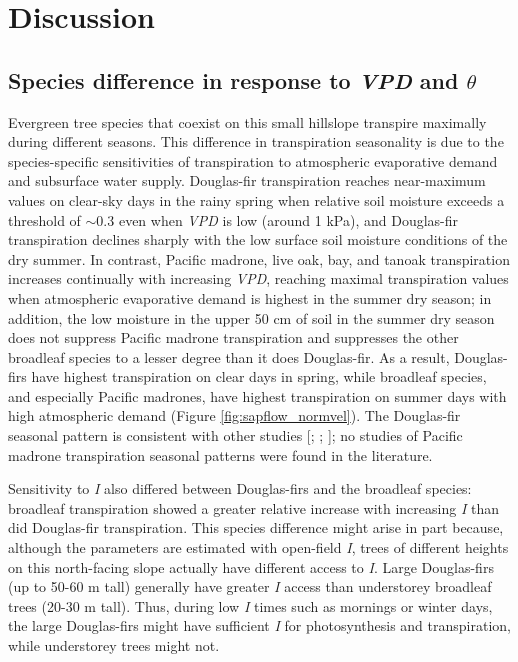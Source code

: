 \section{Discussion}

\subsection{Species difference in response to \textit{VPD} and $\theta$}
Evergreen tree species that coexist on this small hillslope transpire maximally during different seasons.  This difference in transpiration seasonality is due to the species-specific sensitivities of transpiration to atmospheric evaporative demand and subsurface water supply.  Douglas-fir transpiration reaches near-maximum values on clear-sky days in the rainy spring when relative soil moisture exceeds a threshold of $\sim$0.3 even when \textit{VPD} is low (around 1 kPa), and Douglas-fir transpiration declines sharply with the low surface soil moisture conditions of the dry summer.  In contrast, Pacific madrone, live oak, bay, and tanoak transpiration increases continually with increasing \textit{VPD}, reaching maximal transpiration values when atmospheric evaporative demand is highest in the summer dry season; in addition, the low moisture in the upper 50 cm of soil in the summer dry season does not suppress Pacific madrone transpiration and suppresses the other broadleaf species to a lesser degree than it does Douglas-fir.  As a result, Douglas-firs have highest transpiration on clear days in spring, while broadleaf species, and especially Pacific madrones, have highest transpiration on summer days with high atmospheric demand (Figure \ref{fig:sapflow_normvel}).  The Douglas-fir seasonal pattern is consistent with other studies [\cite{jassal2009evapotranspiration}; \cite{moore2004structural}; \cite{granier1987evaluation}]; no studies of Pacific madrone transpiration seasonal patterns were found in the literature.

Sensitivity to \textit{I} also differed between Douglas-firs and the broadleaf species: broadleaf transpiration showed a greater relative increase with increasing \textit{I} than did Douglas-fir transpiration. This species difference might arise in part because, although the parameters are estimated with open-field \textit{I}, trees of different heights on this north-facing slope actually have different access to \textit{I}. Large Douglas-firs (up to 50-60 m tall) generally have greater \textit{I} access than understorey broadleaf trees (20-30 m tall).  Thus, during low \textit{I} times such as mornings or winter days, the large Douglas-firs might have sufficient \textit{I} for photosynthesis and transpiration, while understorey trees might not.

